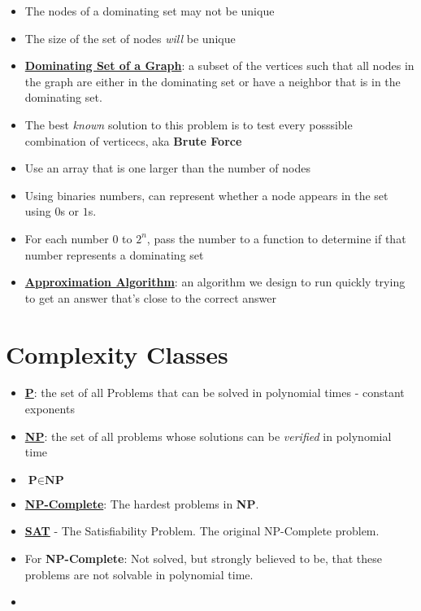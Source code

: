 \documentclass[12pt]{article}
\newcommand{\definition}[1]{\underline{\textbf{#1}}}
\begin{document}
\begin{itemize}

	\item The nodes of a dominating set may not be unique
	\item The size of the set of nodes \textit{will} be unique

	\item \definition{Dominating Set of a Graph}: a subset of the vertices such that all nodes in the graph are either in the dominating set or have a neighbor that is in the dominating set.

	\item The best \textit{known} solution to this problem is to test every posssible combination of verticecs, aka \textbf{Brute Force}

	\item Use an array that is one larger than the number of nodes

	\item Using binaries numbers, can represent whether a node appears in the set using $0$s or $1$s.

	\item For each number 0 to $2^n$, pass the number to a function to determine if that number represents a dominating set

	\item \definition{Approximation Algorithm}: an algorithm we design to run quickly trying to get an answer that's close to the correct answer

\end{itemize}

\section*{Complexity Classes}

\begin{itemize}

	\item \definition{P}: the set of all Problems that can be solved in polynomial times - constant exponents

	\item \definition{NP}: the set of all problems whose solutions can be \textit{verified} in polynomial time

	\item $\textbf{P} \in \textbf{NP}$

	\item \definition{NP-Complete}: The hardest problems in \textbf{NP}.

	\item \definition{SAT} - The Satisfiability Problem. The original NP-Complete problem. 
	
	\item For \textbf{NP-Complete}: Not solved, but strongly believed to be, that these problems are not solvable in polynomial time.

	\item 

\end{itemize}
\end{document}
